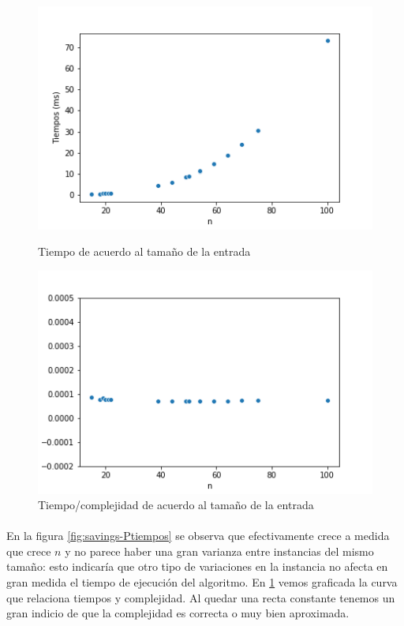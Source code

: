 \begin{figure}[H]
	\centering
	\begin{minipage}{0.44\textwidth}
		\centering
		\includegraphics[width=1\textwidth]{images/savings/Ptiempos}
		\caption{\footnotesize Tiempo de acuerdo al tamaño de la entrada}
		\label{fig:savings-Ptiempos}
	\end{minipage}%
	\hspace{0.03\textwidth}
	\begin{minipage}{0.44\textwidth}
		\centering
		\includegraphics[width=1\textwidth]{images/savings/savingscte}
		\caption{\footnotesize Tiempo/complejidad de acuerdo al tamaño de la entrada}
		\label{fig:savings-Ptiempos-cte}
	\end{minipage}%
\end{figure}

\paragraph{}
En la figura \ref{fig:savings-Ptiempos} se observa que efectivamente crece a medida que crece $n$ y no parece haber una gran varianza entre instancias del mismo tamaño: esto indicaría que otro tipo de variaciones en la instancia no afecta en gran medida el tiempo de ejecución del algoritmo. En \ref{fig:savings-Ptiempos-cte} vemos graficada la curva que relaciona tiempos y complejidad. Al quedar una recta constante tenemos un gran indicio de que la complejidad es correcta o muy bien aproximada.
